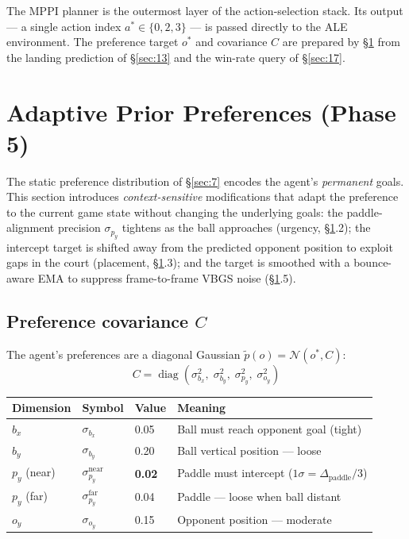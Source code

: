 \documentclass[12pt, a4paper]{article}
\newcommand{\1}{\mathbf{1}}
\newcommand{\cN}{\mathcal{N}}
\begin{document}
The MPPI planner is the outermost layer of the action-selection stack.  Its
output --- a single action index $a^* \in \{0, 2, 3\}$ --- is passed directly to
the ALE environment.  The preference target $o^*$ and covariance $C$ are prepared
by \S\ref{sec:16} from the landing prediction of \S\ref{sec:13} and the win-rate
query of \S\ref{sec:17}.

\section{Adaptive Prior Preferences (Phase 5)}
\label{sec:16}

The static preference distribution of \S\ref{sec:7} encodes the agent's
\textit{permanent} goals.  This section introduces \textit{context-sensitive}
modifications that adapt the preference to the current game state without changing
the underlying goals: the paddle-alignment precision $\sigma_{p_y}$ tightens as
the ball approaches (urgency, \S\ref{sec:16}.2); the intercept target is shifted
away from the predicted opponent position to exploit gaps in the court (placement,
\S\ref{sec:16}.3); and the target is smoothed with a bounce-aware EMA to suppress
frame-to-frame VBGS noise (\S\ref{sec:16}.5).

\subsection{Preference covariance $C$}

The agent's preferences are a diagonal Gaussian $\tilde{p}(o) = \cN(o^*, C)$:
\[
C = \operatorname{diag}(\sigma_{b_x}^2,\; \sigma_{b_y}^2,\;
                          \sigma_{p_y}^2,\; \sigma_{o_y}^2)
\]

\begin{table}[ht]
\centering
\begin{tabular}{llll}
\toprule
Dimension & Symbol & Value & Meaning \\
\midrule
$b_x$ & $\sigma_{b_x}$ & 0.05 &
  Ball must reach opponent goal (tight) \\
$b_y$ & $\sigma_{b_y}$ & 0.20 &
  Ball vertical position --- loose \\
$p_y$ (near) & $\sigma_{p_y}^\text{near}$ & \textbf{0.02} &
  Paddle must intercept ($1\sigma = \Delta_\text{paddle}/3$) \\
$p_y$ (far) & $\sigma_{p_y}^\text{far}$ & 0.04 &
  Paddle --- loose when ball distant \\
$o_y$ & $\sigma_{o_y}$ & 0.15 &
  Opponent position --- moderate \\
\bottomrule
\end{tabular}
\end{table}
\end{document}
